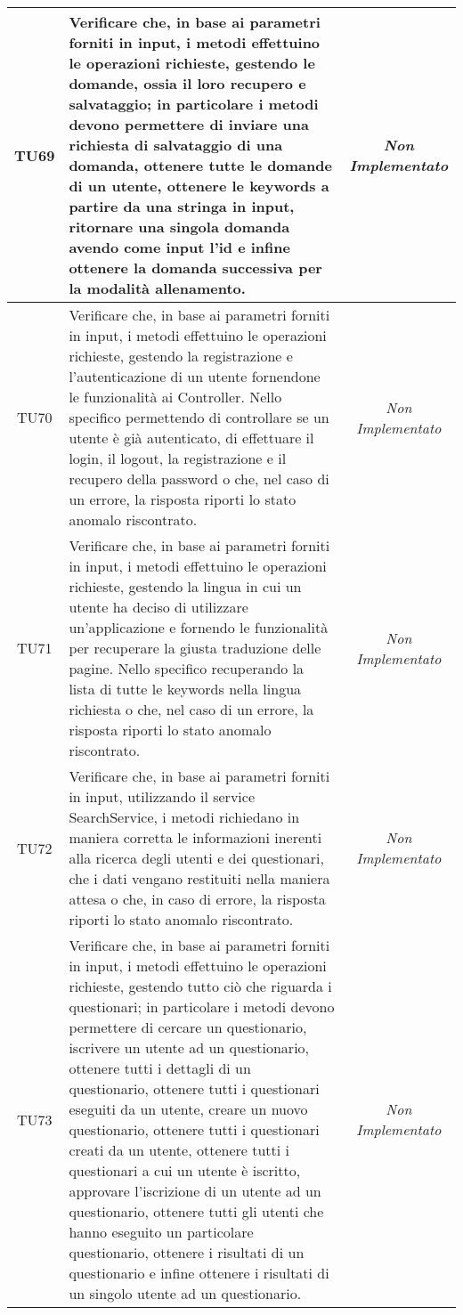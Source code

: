 \begin{longtable}{|c|>{}m{10cm}|c|}
\hypertarget{TU69}{TU69} & Verificare che, in base ai parametri forniti in input, i metodi effettuino le operazioni richieste, gestendo le domande, ossia il loro recupero e salvataggio; in particolare i metodi devono permettere di inviare una richiesta di salvataggio di una domanda, ottenere tutte le domande di un utente, ottenere le keywords a partire da una stringa in input, ritornare una singola domanda avendo come input l'id e infine ottenere la domanda successiva per la modalità allenamento. & \textit{Non Implementato}\\ \hline
\hypertarget{TU70}{TU70} & Verificare che, in base ai parametri forniti in input, i metodi effettuino le operazioni richieste, gestendo la registrazione e l'autenticazione di un utente fornendone le funzionalità ai Controller. Nello specifico permettendo di controllare se un utente è già autenticato, di effettuare il login, il logout, la registrazione e il recupero della password o che, nel caso di un errore, la risposta riporti lo stato anomalo riscontrato. & \textit{Non Implementato}\\ \hline
\hypertarget{TU71}{TU71} & Verificare che, in base ai parametri forniti in input, i metodi effettuino le operazioni richieste, gestendo la lingua in cui un utente ha deciso di utilizzare un'applicazione e fornendo le funzionalità per recuperare la giusta traduzione delle pagine. Nello specifico recuperando la lista di tutte le keywords nella lingua richiesta o che, nel caso di un errore, la risposta riporti lo stato anomalo riscontrato. & \textit{Non Implementato}\\ \hline
\hypertarget{TU72}{TU72} & Verificare che, in base ai parametri forniti in input, utilizzando il service SearchService, i metodi richiedano in maniera corretta le informazioni inerenti alla ricerca degli utenti e dei questionari, che i dati vengano restituiti nella maniera attesa o che, in caso di errore, la risposta riporti lo stato anomalo riscontrato. & \textit{Non Implementato}\\ \hline
\hypertarget{TU73}{TU73} & Verificare che, in base ai parametri forniti in input, i metodi effettuino le operazioni richieste, gestendo tutto ciò che riguarda i questionari; in particolare i metodi devono permettere di cercare un questionario, iscrivere un utente ad un questionario, ottenere tutti i dettagli di un questionario, ottenere tutti i questionari eseguiti da un utente, creare un nuovo questionario, ottenere tutti i questionari creati da un utente, ottenere tutti i questionari a cui un utente è iscritto, approvare l'iscrizione di un utente ad un questionario, ottenere tutti gli utenti che hanno eseguito un particolare questionario, ottenere i risultati di un questionario e infine ottenere i risultati di un singolo utente ad un questionario. & \textit{Non Implementato}\\ \hline

\end{longtable}

